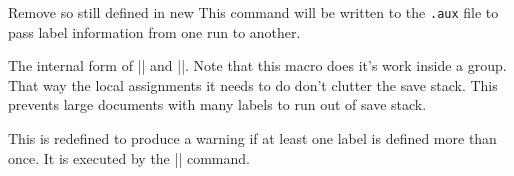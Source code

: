   \begin{macro}{\newlabel}
   {Remove  so still defined in new }
    This command will be written to the \texttt{.aux} file to
    pass label information from one run to another.
  \begin{macro}{\@newl@bel}
    The internal form of |\newlabel| and |\bibcite|. Note that this
    macro does it's work inside a group. That way the local
    assignments it needs to do don't clutter the save stack. This
    prevents large documents with many labels to run out of save
    stack.

    \begin{teX}
\def\@newl@bel#1#2#3{{%
  \@ifundefined{#1@#2}%
    \relax
    {\gdef \@multiplelabels {%
       \@latex@warning@no@line{There were multiply-defined labels}}%
     \@latex@warning@no@line{Label `#2' multiply defined}}%
  \global\@namedef{#1@#2}{#3}}}
    \end{teX}
  
    \begin{teX}
\def\newlabel{\@newl@bel r}
    \end{teX}
  
    \begin{teX}
\@onlypreamble\@newl@bel
    \end{teX}
  \end{macro}
  \end{macro}


  \begin{macro}{\if@multiplelabels}
  \begin{macro}{\@multiplelabels}
    This is redefined to produce a warning if at least one label is
    defined more than once. It is executed by the |\enddocument|
    command.
    \begin{teX}
\let \@multiplelabels \relax
    \end{teX}
  \end{macro}
  \end{macro}


